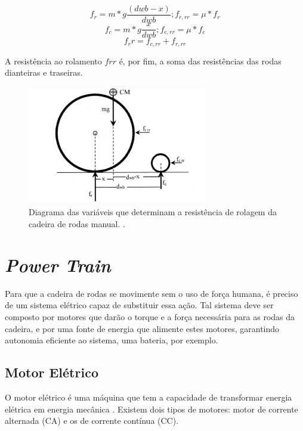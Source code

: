	\begin{equation}
		f_r=m*g\frac{(dwb-x)}{dwb} ; f_{r,rr}=\mu*f_r
	\end{equation}
	\begin{equation}
		f_c=m*g\frac{x}{dwb} ; f_{c,rr}=\mu*f_c
	\end{equation}
	\begin{equation}
	f_rr=f_{c,rr}+ f_{r,rr}
	\end{equation}

	A resistência ao rolamento $frr$ é, por fim, a soma das resistências das rodas dianteiras e traseiras.

	\begin{figure}[!h]
		\centering
		\includegraphics[width = 0.7\textwidth]{figuras/resultados/diagrama_variaveis}
		\caption{Diagrama das variáveis que determinam a resistência de rolagem da cadeira de rodas manual. \cite{propulsao_cadeira}.}
		\label{fig:diagrama_variaveis}
	\end{figure}


\section{\textit{Power Train}}

Para que a cadeira de rodas se movimente sem o uso de força humana, é preciso de um sistema elétrico capaz de substituir essa ação. Tal sistema deve ser composto por motores que darão o torque e a força necessária para as rodas da cadeira, e por uma fonte de energia que alimente estes motores, garantindo autonomia eficiente ao sistema, uma bateria, por exemplo.

\subsection{Motor Elétrico}

O motor elétrico é uma máquina que tem a capacidade de transformar energia elétrica em energia mecânica \cite{projeto_cadeira_rodas_inteligente}. Existem dois tipos de motores: motor de corrente alternada (CA) e os de corrente contínua (CC).

